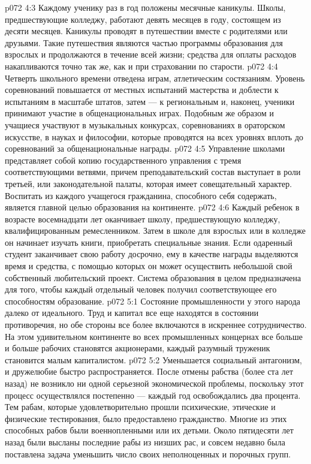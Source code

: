 \vs p072 4:3 \pc Каждому ученику раз в год положены месячные каникулы. Школы, предшествующие колледжу, работают девять месяцев в году, состоящем из десяти месяцев. Каникулы проводят в путешествии вместе с родителями или друзьями. Такие путешествия являются частью программы образования для взрослых и продолжаются в течение всей жизни; средства для оплаты расходов накапливаются точно так же, как и при страховании по старости.
\vs p072 4:4 Четверть школьного времени отведена играм, атлетическим состязаниям. Уровень соревнований повышается от местных испытаний мастерства и доблести к испытаниям в масштабе штатов, затем --- к региональным и, наконец, ученики принимают участие в общенациональных играх. Подобным же образом и учащиеся участвуют в музыкальных конкурсах, соревнованиях в ораторском искусстве, в науках и философии, которые проводятся на всех уровнях вплоть до соревнований за общенациональные награды.
\vs p072 4:5 Управление школами представляет собой копию государственного управления с тремя соответствующими ветвями, причем преподавательский состав выступает в роли третьей, или законодательной палаты, которая имеет совещательный характер. Воспитать из каждого учащегося гражданина, способного себя содержать, является главной целью образования на континенте.
\vs p072 4:6 Каждый ребенок в возрасте восемнадцати лет оканчивает школу, предшествующую колледжу, квалифицированным ремесленником. Затем в школе для взрослых или в колледже он начинает изучать книги, приобретать специальные знания. Если одаренный студент заканчивает свою работу досрочно, ему в качестве награды выделяются время и средства, с помощью которых он может осуществить небольшой свой собственный любительский проект. Система образования в целом предназначена для того, чтобы каждый отдельный человек получил соответствующее его способностям образование.
\vs p072 5:1 Состояние промышленности у этого народа далеко от идеального. Труд и капитал все еще находятся в состоянии противоречия, но обе стороны все более включаются в искреннее сотрудничество. На этом удивительном континенте во всех промышленных концернах все больше и больше рабочих становятся акционерами, каждый разумный труженик становится малым капиталистом.
\vs p072 5:2 Уменьшается социальный антагонизм, и дружелюбие быстро распространяется. После отмены рабства (более ста лет назад) не возникло ни одной серьезной экономической проблемы, поскольку этот процесс осуществлялся постепенно --- каждый год освобождались два процента. Тем рабам, которые удовлетворительно прошли психические, этические и физические тестирования, было предоставлено гражданство. Многие из этих способных рабов были военнопленными или их детьми. Около пятидесяти лет назад были высланы последние рабы из низших рас, и совсем недавно была поставлена задача уменьшить число своих неполноценных и порочных групп.
